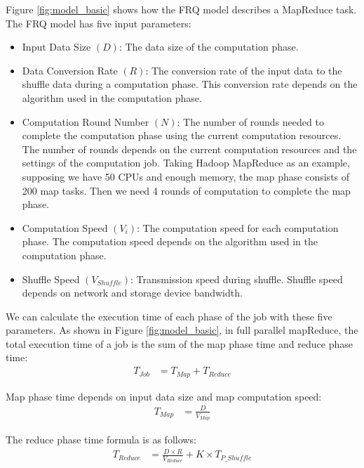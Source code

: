 {Figure \ref{fig:model_basic} shows how the FRQ model describes a MapReduce task. The FRQ model has five input parameters:
\begin{itemize}
	\item Input Data Size \((D)\): The data size of the computation phase.
	\item Data Conversion Rate \((R)\): The conversion rate of the input data to the shuffle data during a computation phase. This conversion rate depends on the algorithm used in the computation phase.
    \item Computation Round Number \((N)\): The number of rounds needed to complete the computation phase using the current computation resources. The number of rounds depends on the current computation resources and the settings of the computation job. Taking Hadoop MapReduce as an example, supposing we have 50 CPUs and enough memory, the map phase consists of 200 map tasks. Then we need 4 rounds of computation to complete the map phase.
    \item Computation Speed \((V_{i})\): 
    The computation speed for each computation phase. The computation speed depends on the algorithm used in the computation phase.
    \item Shuffle Speed \((V_{Shuffle})\): 
    Transmission speed during shuffle. Shuffle speed depends on network and storage device bandwidth.
\end{itemize}

We can calculate the execution time of each phase of the job with these five parameters. As shown in Figure \ref{fig:model_basic}, in full parallel mapReduce, the total execution time of a job is the sum of the map phase time and reduce phase time:
\begin{equation}
\label{equation_Tjob}
\begin{aligned}
    T_{Job} &= T_{Map} + T_{Reduce}
\end{aligned}
\end{equation}

Map phase time depends on input data size and map computation speed:
\begin{equation}
\label{equation_Tmap}
\begin{aligned}
    T_{Map} &= {{\frac{D}{V_{Map}}}}
\end{aligned}
\end{equation}

The reduce phase time formula is as follows:
\begin{equation}
\label{equation_Treduce}
\begin{aligned}
    T_{Reduce} &= \frac{D \times R}{V_{Reduce}} + K \times T_{P\_Shuffle}
\end{aligned}
\end{equation}

}
